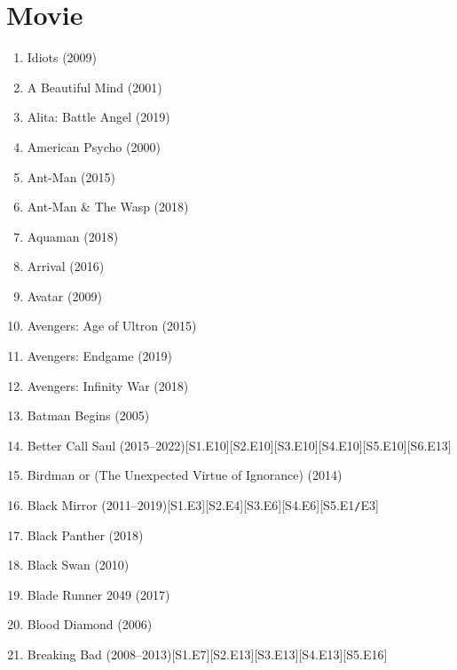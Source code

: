 \documentclass{article}
\begin{document}
\section{Movie}

\begin{enumerate}
	\item { Idiots} (2009)
	\item {\sc A Beautiful Mind} (2001)
	\item {\sc Alita: Battle Angel} (2019)
	\item {\sc American Psycho} (2000)
	\item {\sc Ant-Man} (2015)
	\item {\sc Ant-Man \& The Wasp} (2018)
	\item {\sc Aquaman} (2018)
	\item {\sc Arrival} (2016)
	\item {\sc Avatar} (2009)
	\item {\sc Avengers: Age of Ultron} (2015)
	\item {\sc Avengers: Endgame} (2019)
	\item {\sc Avengers: Infinity War} (2018)
	\item {\sc Batman Begins} (2005)
	\item {\sc Better Call Saul} (2015--2022)\hfill[S1.E10][S2.E10][S3.E10][S4.E10][S5.E10][S6.E13]
	\item {\sc Birdman or (The Unexpected Virtue of Ignorance)} (2014)
	\item Black Mirror (2011--2019)\hfill[S1.E3][S2.E4][S3.E6][S4.E6][S5.E1{\tt/}E3]
	\item {\sc Black Panther} (2018)
	\item {\sc Black Swan} (2010)
	\item {\sc Blade Runner 2049} (2017)
	\item {\sc Blood Diamond} (2006)
	\item {\sc Breaking Bad} (2008--2013)\hfill[S1.E7][S2.E13][S3.E13][S4.E13][S5.E16]
	

\end{enumerate}
\end{document}
